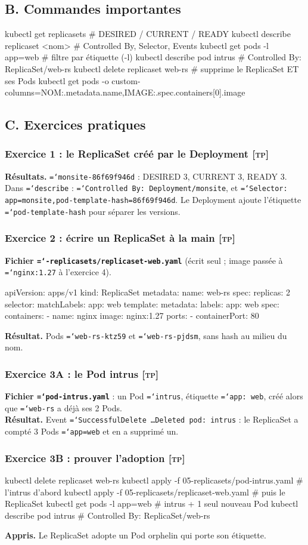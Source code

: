 \documentclass[11pt,a4paper]{article}
\newcommand{\cmd}[1]{\texttt{\hyphenchar\font=`\-#1}}
\newcommand{\tp}{\textsc{[tp]}}
\newcommand{\partie}[1]{\needspace{9\baselineskip}\subsection*{#1}}
\newcommand{\exo}[1]{\needspace{8\baselineskip}\subsubsection*{#1}}
\begin{document}
\partie{B. Commandes importantes}
\begin{code}
kubectl get replicasets                    # DESIRED / CURRENT / READY
kubectl describe replicaset <nom>          # Controlled By, Selector, Events
kubectl get pods -l app=web                # filtre par étiquette (-l)
kubectl describe pod intrus                # Controlled By: ReplicaSet/web-rs
kubectl delete replicaset web-rs           # supprime le ReplicaSet ET ses Pods
kubectl get pods -o custom-columns=NOM:.metadata.name,IMAGE:.spec.containers[0].image
\end{code}

\partie{C. Exercices pratiques}
\exo{Exercice 1 : le ReplicaSet créé par le Deployment \tp}
\textbf{Résultats.} \cmd{monsite-86f69f946d} : DESIRED 3, CURRENT 3, READY 3. Dans \cmd{describe} : \cmd{Controlled By: Deployment/monsite}, et \cmd{Selector: app=monsite,pod-template-hash=86f69f946d}. Le Deployment ajoute l'étiquette \cmd{pod-template-hash} pour séparer les versions.

\exo{Exercice 2 : écrire un ReplicaSet à la main \tp}
\textbf{Fichier \cmd{05-replicasets/replicaset-web.yaml}} (écrit seul ; image passée à \cmd{nginx:1.27} à l'exercice 4).
\begin{code}
apiVersion: apps/v1
kind: ReplicaSet
metadata:
  name: web-rs
spec:
  replicas: 2
  selector:
    matchLabels:
      app: web
  template:
    metadata:
      labels:
        app: web
    spec:
      containers:
        - name: nginx
          image: nginx:1.27
          ports:
            - containerPort: 80
\end{code}
\textbf{Résultat.} Pods \cmd{web-rs-ktz59} et \cmd{web-rs-pjdsm}, sans hash au milieu du nom.

\exo{Exercice 3A : le Pod intrus \tp}
\textbf{Fichier \cmd{pod-intrus.yaml}} : un Pod \cmd{intrus}, étiquette \cmd{app: web}, créé alors que \cmd{web-rs} a déjà ses 2 Pods.\\
\textbf{Résultat.} Event \cmd{SuccessfulDelete \ldots Deleted pod: intrus} : le ReplicaSet a compté 3 Pods \cmd{app=web} et en a supprimé un.

\exo{Exercice 3B : prouver l'adoption \tp}
\begin{code}
kubectl delete replicaset web-rs
kubectl apply -f 05-replicasets/pod-intrus.yaml       # l'intrus d'abord
kubectl apply -f 05-replicasets/replicaset-web.yaml   # puis le ReplicaSet
kubectl get pods -l app=web                           # intrus + 1 seul nouveau Pod
kubectl describe pod intrus                           # Controlled By: ReplicaSet/web-rs
\end{code}
\textbf{Appris.} Le ReplicaSet adopte un Pod orphelin qui porte son étiquette.
\end{document}
